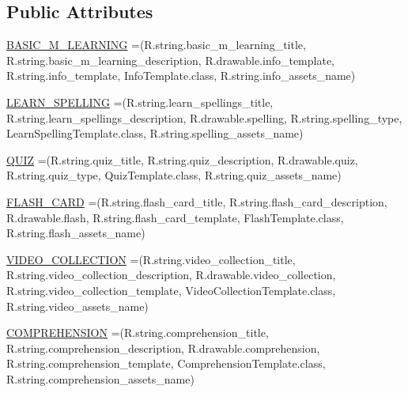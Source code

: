\subsection*{Public Attributes}
\begin{DoxyCompactItemize}
\item 
\hyperlink{enumorg_1_1buildmlearn_1_1toolkit_1_1model_1_1Template_a677ac7115aa6a442f35bdc7e2f44868f}{B\+A\+S\+I\+C\+\_\+\+M\+\_\+\+L\+E\+A\+R\+N\+I\+NG} =(R.\+string.\+basic\+\_\+m\+\_\+learning\+\_\+title, R.\+string.\+basic\+\_\+m\+\_\+learning\+\_\+description, R.\+drawable.\+info\+\_\+template, R.\+string.\+info\+\_\+template, Info\+Template.\+class, R.\+string.\+info\+\_\+assets\+\_\+name)
\item 
\hyperlink{enumorg_1_1buildmlearn_1_1toolkit_1_1model_1_1Template_ac92d5f18de318d36ba42ae0aba85576d}{L\+E\+A\+R\+N\+\_\+\+S\+P\+E\+L\+L\+I\+NG} =(R.\+string.\+learn\+\_\+spellings\+\_\+title, R.\+string.\+learn\+\_\+spellings\+\_\+description, R.\+drawable.\+spelling, R.\+string.\+spelling\+\_\+type, Learn\+Spelling\+Template.\+class, R.\+string.\+spelling\+\_\+assets\+\_\+name)
\item 
\hyperlink{enumorg_1_1buildmlearn_1_1toolkit_1_1model_1_1Template_aee37e120e37544ed8fff5341f9012fee}{Q\+U\+IZ} =(R.\+string.\+quiz\+\_\+title, R.\+string.\+quiz\+\_\+description, R.\+drawable.\+quiz, R.\+string.\+quiz\+\_\+type, Quiz\+Template.\+class, R.\+string.\+quiz\+\_\+assets\+\_\+name)
\item 
\hyperlink{enumorg_1_1buildmlearn_1_1toolkit_1_1model_1_1Template_a320459af7080ce10a9bbca2f60224865}{F\+L\+A\+S\+H\+\_\+\+C\+A\+RD} =(R.\+string.\+flash\+\_\+card\+\_\+title, R.\+string.\+flash\+\_\+card\+\_\+description, R.\+drawable.\+flash, R.\+string.\+flash\+\_\+card\+\_\+template, Flash\+Template.\+class, R.\+string.\+flash\+\_\+assets\+\_\+name)
\item 
\hyperlink{enumorg_1_1buildmlearn_1_1toolkit_1_1model_1_1Template_a0b4b1d2ede6cce85075ed131f22f1743}{V\+I\+D\+E\+O\+\_\+\+C\+O\+L\+L\+E\+C\+T\+I\+ON} =(R.\+string.\+video\+\_\+collection\+\_\+title, R.\+string.\+video\+\_\+collection\+\_\+description, R.\+drawable.\+video\+\_\+collection, R.\+string.\+video\+\_\+collection\+\_\+template, Video\+Collection\+Template.\+class, R.\+string.\+video\+\_\+assets\+\_\+name)
\item 
\hyperlink{enumorg_1_1buildmlearn_1_1toolkit_1_1model_1_1Template_a930312f1946ad623b664609de2a4e9bc}{C\+O\+M\+P\+R\+E\+H\+E\+N\+S\+I\+ON} =(R.\+string.\+comprehension\+\_\+title, R.\+string.\+comprehension\+\_\+description, R.\+drawable.\+comprehension, R.\+string.\+comprehension\+\_\+template, Comprehension\+Template.\+class, R.\+string.\+comprehension\+\_\+assets\+\_\+name)

\end{DoxyCompactItemize}
